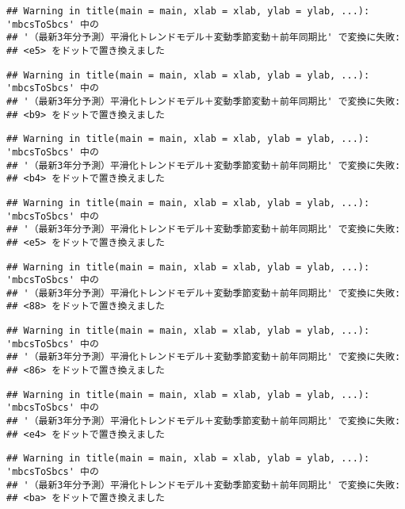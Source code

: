 \documentclass[]{article}
\begin{document}
\begin{verbatim}
## Warning in title(main = main, xlab = xlab, ylab = ylab, ...): 'mbcsToSbcs' 中の
## '（最新3年分予測）平滑化トレンドモデル＋変動季節変動＋前年同期比' で変換に失敗:
## <e5> をドットで置き換えました
\end{verbatim}

\begin{verbatim}
## Warning in title(main = main, xlab = xlab, ylab = ylab, ...): 'mbcsToSbcs' 中の
## '（最新3年分予測）平滑化トレンドモデル＋変動季節変動＋前年同期比' で変換に失敗:
## <b9> をドットで置き換えました
\end{verbatim}

\begin{verbatim}
## Warning in title(main = main, xlab = xlab, ylab = ylab, ...): 'mbcsToSbcs' 中の
## '（最新3年分予測）平滑化トレンドモデル＋変動季節変動＋前年同期比' で変換に失敗:
## <b4> をドットで置き換えました
\end{verbatim}

\begin{verbatim}
## Warning in title(main = main, xlab = xlab, ylab = ylab, ...): 'mbcsToSbcs' 中の
## '（最新3年分予測）平滑化トレンドモデル＋変動季節変動＋前年同期比' で変換に失敗:
## <e5> をドットで置き換えました
\end{verbatim}

\begin{verbatim}
## Warning in title(main = main, xlab = xlab, ylab = ylab, ...): 'mbcsToSbcs' 中の
## '（最新3年分予測）平滑化トレンドモデル＋変動季節変動＋前年同期比' で変換に失敗:
## <88> をドットで置き換えました
\end{verbatim}

\begin{verbatim}
## Warning in title(main = main, xlab = xlab, ylab = ylab, ...): 'mbcsToSbcs' 中の
## '（最新3年分予測）平滑化トレンドモデル＋変動季節変動＋前年同期比' で変換に失敗:
## <86> をドットで置き換えました
\end{verbatim}

\begin{verbatim}
## Warning in title(main = main, xlab = xlab, ylab = ylab, ...): 'mbcsToSbcs' 中の
## '（最新3年分予測）平滑化トレンドモデル＋変動季節変動＋前年同期比' で変換に失敗:
## <e4> をドットで置き換えました
\end{verbatim}

\begin{verbatim}
## Warning in title(main = main, xlab = xlab, ylab = ylab, ...): 'mbcsToSbcs' 中の
## '（最新3年分予測）平滑化トレンドモデル＋変動季節変動＋前年同期比' で変換に失敗:
## <ba> をドットで置き換えました
\end{verbatim}
\end{document}
